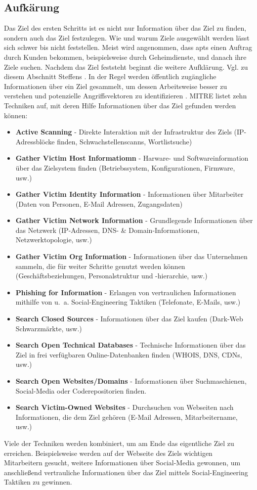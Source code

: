 \documentclass[conference]{IEEEtran}
\begin{document}
\subsection{Aufkärung}
Das Ziel des ersten Schritts ist es nicht nur Information über das Ziel zu finden, sondern auch das Ziel festzulegen.
Wie und warum Ziele ausgewählt werden lässt sich schwer bis nicht feststellen.
Meist wird angenommen, dass \acp{apt} einen Auftrag durch Kunden bekommen, beispielsweise durch Geheimdienste, und danach ihre Ziele suchen.
Nachdem das Ziel feststeht beginnt die weitere Aufklärung.
Vgl. zu diesem Abschnitt Steffens \cite[S.~10-13]{Steffens2020}.
In der Regel werden öffentlich zugängliche Informationen über ein Ziel gesammelt, um dessen Arbeitsweise besser zu verstehen und potenzielle Angriffsvektoren zu identifizieren \cite{Cole2013}.
MITRE \cite{MITREReconnaissance} listet zehn Techniken auf, mit deren Hilfe Informationen über das Ziel gefunden werden können:
\begin{itemize}
    \item \textbf{Active Scanning} - Direkte Interaktion mit der Infrastruktur des Ziels (IP-Adressblöcke finden, Schwachstellenscanns, Wortlistsuche)
    \item \textbf{Gather Victim Host Informatiomn} - Harware- und Softwareinformation über das Zielsystem finden (Betriebssystem, Konfigurationen, Firmware, usw.)
    \item \textbf{Gather Victim Identity Information} - Informationen über Mitarbeiter (Daten von Personen, E-Mail Adressen, Zugangsdaten)
    \item \textbf{Gather Victim Network Information} - Grundlegende Informationen über das Netzwerk (IP-Adressen, DNS- \& Domain-Informationen, Netzwerktopologie, usw.)
    \item \textbf{Gather Victim Org Information} - Informationen über das Unternehmen sammeln, die für weiter Schritte genutzt werden können (Geschäftsbeziehungen, Personalstruktur und -hierarchie, usw.)
    \item \textbf{Phishing for Information} - Erlangen von vertraulichen Informationen mithilfe von u.~a. Social-Engineering Taktiken (Telefonate, E-Mails, usw.)
    \item \textbf{Search Closed Sources} - Informationen über das Ziel kaufen (Dark-Web Schwarzmärkte, usw.)
    \item \textbf{Search Open Technical Databases} - Technische Informationen über das Ziel in frei verfügbaren Online-Datenbanken finden (WHOIS, DNS, CDNs, usw.)
    \item \textbf{Search Open Websites/Domains} - Informationen über Suchmaschienen, Social-Media oder Coderepositorien finden.
    \item \textbf{Search Victim-Owned Websites} - Durchsuchen von Webseiten nach Informationen, die dem Ziel gehören (E-Mail Adressen, Mitarbeitername, usw.)
\end{itemize}
Viele der Techniken werden kombiniert, um am Ende das eigentliche Ziel zu erreichen.
Beispielsweise werden auf der Webseite des Ziels wichtigen Mitarbeitern gesucht, weitere Informationen über Social-Media gewonnen, um anschließend vertrauliche Informationen über das Ziel mittels Social-Engineering Taktiken zu gewinnen.
\end{document}
